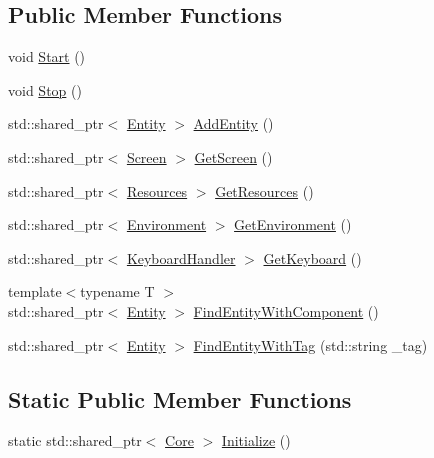 \subsection*{Public Member Functions}
\begin{DoxyCompactItemize}
\item 
void \mbox{\hyperlink{class_core_a44f0db8bca5b6fd85f3948250287bdbd}{Start}} ()
\item 
void \mbox{\hyperlink{class_core_acab57c44acf4231e8310d93310667990}{Stop}} ()
\item 
std\+::shared\+\_\+ptr$<$ \mbox{\hyperlink{class_entity}{Entity}} $>$ \mbox{\hyperlink{class_core_a6cd7b26cd56b4a42da9ae8826de0df17}{Add\+Entity}} ()
\item 
std\+::shared\+\_\+ptr$<$ \mbox{\hyperlink{class_screen}{Screen}} $>$ \mbox{\hyperlink{class_core_a76fb4db2f5c8214d1b021bc86b2c3b9c}{Get\+Screen}} ()
\item 
std\+::shared\+\_\+ptr$<$ \mbox{\hyperlink{class_resources}{Resources}} $>$ \mbox{\hyperlink{class_core_acb593d32db59735a95768084eb4f0b19}{Get\+Resources}} ()
\item 
std\+::shared\+\_\+ptr$<$ \mbox{\hyperlink{class_environment}{Environment}} $>$ \mbox{\hyperlink{class_core_a3a17d61ebebe3ebef9dc494f3112e3e7}{Get\+Environment}} ()
\item 
std\+::shared\+\_\+ptr$<$ \mbox{\hyperlink{class_keyboard_handler}{Keyboard\+Handler}} $>$ \mbox{\hyperlink{class_core_a24a4ef158caf9f6a718dd0931e000e6c}{Get\+Keyboard}} ()
\item 
{\footnotesize template$<$typename T $>$ }\\std\+::shared\+\_\+ptr$<$ \mbox{\hyperlink{class_entity}{Entity}} $>$ \mbox{\hyperlink{class_core_a29fd512c6fae721c491de2b1bfcd9ce1}{Find\+Entity\+With\+Component}} ()
\item 
std\+::shared\+\_\+ptr$<$ \mbox{\hyperlink{class_entity}{Entity}} $>$ \mbox{\hyperlink{class_core_a57ad2a53d1d291949c31a6c9ba493cdb}{Find\+Entity\+With\+Tag}} (std\+::string \+\_\+tag)
\end{DoxyCompactItemize}
\subsection*{Static Public Member Functions}
\begin{DoxyCompactItemize}
\item 
static std\+::shared\+\_\+ptr$<$ \mbox{\hyperlink{class_core}{Core}} $>$ \mbox{\hyperlink{class_core_ab62f686765accb870bbde07184b52bef}{Initialize}} ()
\end{DoxyCompactItemize}


